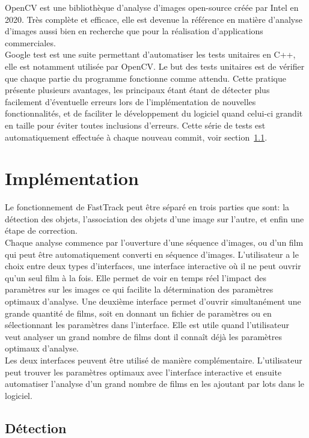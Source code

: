 	OpenCV est une bibliothèque d'analyse d'images open-source créée par Intel en 2020. Très complète et efficace, elle est devenue la référence en matière d'analyse d'images aussi bien en recherche que pour la réalisation d'applications commerciales.\\
	
	Google test est une suite permettant d'automatiser les tests unitaires en C++, elle est notamment utilisée par OpenCV. Le but des tests unitaires est de vérifier que chaque partie du programme fonctionne comme attendu. Cette pratique présente plusieurs avantages, les principaux étant étant de détecter plus facilement d'éventuelle erreurs lors de l'implémentation de nouvelles fonctionnalités, et de faciliter le développement du logiciel quand celui-ci grandit en taille pour éviter toutes inclusions d'erreurs. Cette série de tests est automatiquement effectuée à chaque nouveau commit, voir section~\ref{}.
	
	\section{Implémentation}
	
	Le fonctionnement de FastTrack peut être séparé en trois parties que sont: la détection des objets, l'association des objets d'une image sur l'autre, et enfin une étape de correction.\\
	
	Chaque analyse commence par l'ouverture d'une séquence d'images, ou d'un film qui peut être automatiquement converti en séquence d'images. L'utilisateur a le choix entre deux types d'interfaces, une interface interactive où il ne peut ouvrir qu'un seul film à la fois. Elle permet de voir en temps réel l'impact des paramètres sur les images ce qui facilite la détermination des paramètres optimaux d'analyse. Une deuxième interface permet d'ouvrir simultanément une grande quantité de films, soit en donnant un fichier de paramètres ou en sélectionnant les paramètres dans l'interface. Elle est utile quand l'utilisateur veut analyser un grand nombre de films dont il connaît déjà les paramètres optimaux d'analyse.\\
	
	Les deux interfaces peuvent être utilisé de manière complémentaire. L'utilisateur peut trouver les paramètres optimaux avec l'interface interactive et ensuite automatiser l'analyse d'un grand nombre de films en les ajoutant par lots dans le logiciel.
	
	
		\subsection{Détection}
		
